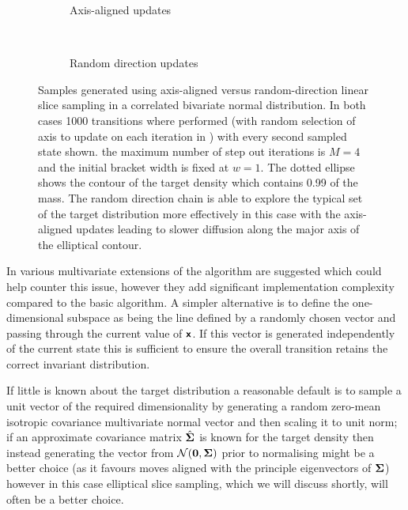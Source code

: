 \begin{figure}
\centering
\begin{subfigure}[b]{.46\linewidth}
\centering
  \vspace{-6mm}
  \caption{Axis-aligned updates}
  \label{sfig:axis-aligned-linear-slice-sampler}
\end{subfigure}
~~
\begin{subfigure}[b]{.46\linewidth}
\centering
  \vspace{-6mm}
  \caption{Random direction updates}
  \label{sfig:random-direction-linear-slice-sampler}
\end{subfigure}
  \caption[Linear slice sampler comparison.]{Samples generated using  axis-aligned versus  random-direction  linear slice sampling in a correlated bivariate normal distribution. In both cases 1000 transitions where performed (with random selection of axis to update on each iteration in ) with every second sampled state shown.  the maximum number of step out iterations is $M=4$ and the initial bracket width is fixed at $w=1$. The dotted ellipse shows the contour of the target density which contains 0.99 of the mass. The random direction chain is able to explore the typical set of the target distribution more effectively in this case with the axis-aligned updates leading to slower diffusion along the major axis of the elliptical contour.}
  \label{fig:linear-slice-sampler-comparison}
\end{figure}

In \citep{neal2003slice} various multivariate extensions of the algorithm are suggested which could help counter this issue, however they add significant implementation complexity compared to the basic algorithm. A simpler alternative is to define the one-dimensional subspace as being the line defined by a randomly chosen vector and passing through the current value of $\boldsymbol{\mathsf{x}}$. If this vector is generated independently of the current state this is sufficient to ensure the overall transition retains the correct invariant distribution. 

If little is known about the target distribution a reasonable default is to sample a unit vector of the required dimensionality by generating a random zero-mean isotropic covariance multivariate normal vector and then scaling it to unit norm; if an approximate covariance matrix $\hat{\boldsymbol{\Sigma}}$ is known for the target density then instead generating the vector from $\nrm{\vct{0},\mtx{\Sigma}}$ prior to normalising might be a better choice (as it favours moves aligned with the principle eigenvectors of $\boldsymbol{\Sigma}$) however in this case elliptical slice sampling, which we will discuss shortly, will often be a better choice. 

